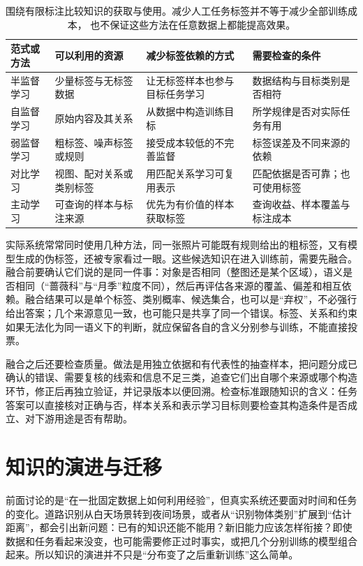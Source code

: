 \begin{table}[htbp]
  \centering
  \small
  \begin{tabularx}{\linewidth}{@{}lXXX@{}}
    \toprule
    \textbf{范式或方法} & \textbf{可以利用的资源} & \textbf{减少标签依赖的方式} & \textbf{需要检查的条件} \\
    \midrule
    半监督学习 & 少量标签与无标签数据 & 让无标签样本也参与目标任务学习 & 数据结构与目标类别是否相符 \\
    自监督学习 & 原始内容及其关系 & 从数据中构造训练目标 & 所学规律是否对实际任务有用 \\
    弱监督学习 & 粗标签、噪声标签或规则 & 接受成本较低的不完善监督 & 标签误差及不同来源的依赖 \\
    对比学习 & 视图、配对关系或类别标签 & 用匹配关系学习可复用表示 & 匹配依据是否可靠；也可使用标签 \\
    主动学习 & 可查询的样本与标注来源 & 优先为有价值的样本获取标签 & 查询收益、样本覆盖与标注成本 \\
    \bottomrule
  \end{tabularx}
  \caption{围绕有限标注比较知识的获取与使用。减少人工任务标签并不等于减少全部训练成本，
  也不保证这些方法在任意数据上都能提高效果。}
  \label{tab:efficient-knowledge-use-comparison}
\end{table}

实际系统常常同时使用几种方法，同一张照片可能既有规则给出的粗标签，又有模型生成的伪标签，还被专家看过一眼。这些候选知识在进入训练前，需要先融合。融合前要确认它们说的是同一件事：对象是否相同（整图还是某个区域），语义是否相同（“蔷薇科”与“月季”粒度不同），然后再评估各来源的覆盖、偏差和相互依赖。融合结果可以是单个标签、类别概率、候选集合，也可以是“弃权”，不必强行给出答案；几个来源意见一致，也可能只是共享了同一个错误。标签、关系和约束如果无法化为同一语义下的判断，就应保留各自的含义分别参与训练，不能直接投票。

融合之后还要检查质量。做法是用独立依据和有代表性的抽查样本，把问题分成已确认的错误、需要复核的线索和信息不足三类，追查它们出自哪个来源或哪个构造环节，修正后再独立验证，并记录版本以便回溯。检查标准跟随知识的含义：任务答案可以直接核对正确与否，样本关系和表示学习目标则要检查其构造条件是否成立、对下游用途是否有帮助。

\section{知识的演进与迁移}
\label{sec:knowledge-evolution-and-transfer-overview}

前面讨论的是“在一批固定数据上如何利用经验”，但真实系统还要面对时间和任务的变化。道路识别从白天场景转到夜间场景，或者从“识别物体类别”扩展到“估计距离”，都会引出新问题：已有的知识还能不能用？新旧能力应该怎样衔接？即使数据和任务看起来没变，也可能需要修正过时事实，或把几个分别训练的模型组合起来。所以知识的演进并不只是“分布变了之后重新训练”这么简单。

